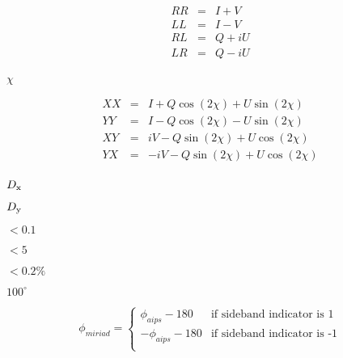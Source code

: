 {\newpage\clearpage
{}%
\begin{eqnarray*}
RR &=& I + V \\
LL &=& I - V \\
RL &=& Q + iU \\
LR &=& Q - iU \\
\end{eqnarray*}%
\lthtmldisplayZ
\lthtmlcheckvsize\clearpage}

{\newpage\clearpage
{}%
$\chi$%
\lthtmlinlinemathZ
\lthtmlcheckvsize\clearpage}

{\newpage\clearpage
{}%
\begin{eqnarray*}
XX &=& I + Q \cos(2\chi) + U \sin(2\chi) \\
YY &=& I - Q \cos(2\chi) - U \sin(2\chi) \\
XY &=& iV - Q \sin(2\chi) + U \cos(2\chi) \\
YX &=& -iV - Q \sin(2\chi) + U \cos(2\chi) \\
\end{eqnarray*}%
\lthtmldisplayZ
\lthtmlcheckvsize\clearpage}

{\newpage\clearpage
{}%
$D_{\rm x}$%
\lthtmlinlinemathZ
\lthtmlcheckvsize\clearpage}

{\newpage\clearpage
{}%
$D_{\rm y}$%
\lthtmlinlinemathZ
\lthtmlcheckvsize\clearpage}

{\newpage\clearpage
{}%
$< 0.1$%
\lthtmlinlinemathZ
\lthtmlcheckvsize\clearpage}

{\newpage\clearpage
{}%
$< 5$%
\lthtmlinlinemathZ
\lthtmlcheckvsize\clearpage}

{\newpage\clearpage
{}%
$< 0.2\%$%
\lthtmlinlinemathZ
\lthtmlcheckvsize\clearpage}

{\newpage\clearpage
{}%
$100^\circ$%
\lthtmlinlinemathZ
\lthtmlcheckvsize\clearpage}

{\newpage\clearpage
{}%
\begin{displaymath}
\phi_{miriad} = \left\{ \begin{array}{ll}
		\phi_{aips} - 180 & \mbox{if sideband indicator is 1}\\
		-\phi_{aips}- 180 & \mbox{if sideband indicator is -1}\\
		\end{array}\right.
\end{displaymath}%
\lthtmldisplayZ
\lthtmlcheckvsize\clearpage}

